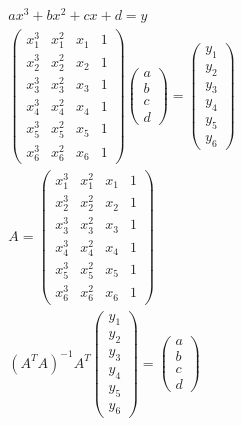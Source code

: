 \documentclass[12pt]{extarticle}
\newcommand {\pmat}[1]{\begin{pmatrix}#1\end{pmatrix}}
\begin{document}

\begin{gather*}
    ax^3 + bx^2 + cx + d = y \\
    \pmat {
        x_1^3 & x_1^2 & x_1 & 1 \\
        x_2^3 & x_2^2 & x_2 & 1 \\
        x_3^3 & x_3^2 & x_3 & 1 \\
        x_4^3 & x_4^2 & x_4 & 1 \\
        x_5^3 & x_5^2 & x_5 & 1 \\
        x_6^3 & x_6^2 & x_6 & 1
    }
    \pmat {
        a \\ b \\ c \\ d
    }
    =
    \pmat {
        y_1 \\ y_2 \\ y_3 \\ y_4 \\ y_5 \\ y_6
    } \\
    A =
    \pmat {
        x_1^3 & x_1^2 & x_1 & 1 \\
        x_2^3 & x_2^2 & x_2 & 1 \\
        x_3^3 & x_3^2 & x_3 & 1 \\
        x_4^3 & x_4^2 & x_4 & 1 \\
        x_5^3 & x_5^2 & x_5 & 1 \\
        x_6^3 & x_6^2 & x_6 & 1
    } \\
    (A^TA)^{-1}A^T 
    \pmat {
        y_1 \\ y_2 \\ y_3 \\ y_4 \\ y_5 \\ y_6
    }
    =
    \pmat {
        a \\ b \\ c \\ d
    }
\end{gather*}
\end{document}
